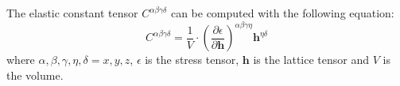 \documentclass[prb,preprint]{revtex4-2}
\begin{document}
The elastic constant tensor $C^{\alpha\beta\gamma\delta}$ can be computed with 
the following equation:
\begin{equation}
C^{\alpha\beta\gamma\delta} = \frac{1}{V} \cdot \left(
    \frac{\partial\epsilon}{\partial\mathbf{h}}
\right)^ {\alpha\beta\gamma\eta} \mathbf{h}^{\eta\delta}
\end{equation}
where $\alpha, \beta, \gamma, \eta, \delta = x, y, z$, $\epsilon$ is the stress
tensor, $\mathbf{h}$ is the lattice tensor and $V$ is the volume.
\end{document}
